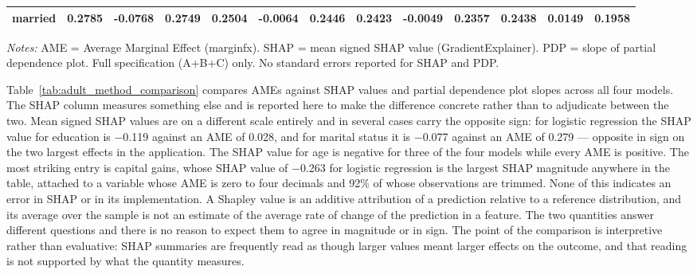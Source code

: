 \documentclass[12pt,a4paper]{article}
\numberwithin{equation}{section}
\theoremstyle{plain}
\theoremstyle{definition}
\begin{document}
\begin{table}
\begin{threeparttable}
\begin{tabular}{lrrrrrrrrrrrr}
				married & 0.2785 & -0.0768 & 0.2749 & 0.2504 & -0.0064 & 0.2446 & 0.2423 & -0.0049 & 0.2357 & 0.2438 & 0.0149 & 0.1958 \\
				\bottomrule
				\end{tabular}
				\begin{tablenotes}
				\footnotesize
				\item \textit{Notes:} AME = Average Marginal Effect (marginfx). SHAP = mean signed SHAP value (GradientExplainer). PDP = slope of partial dependence plot. Full specification (A+B+C) only. No standard errors reported for SHAP and PDP.
				\end{tablenotes}
		\end{threeparttable}
	\end{table}
	
	Table~\ref{tab:adult_method_comparison} compares AMEs against SHAP values and partial dependence plot slopes across all four models. The SHAP column measures something else and is reported here to make the difference concrete rather than to adjudicate between the two. Mean signed SHAP values are on a different scale entirely and in several cases carry the opposite sign: for logistic regression the SHAP value for education is $-$0.119 against an AME of 0.028, and for marital status it is $-$0.077 against an AME of 0.279 --- opposite in sign on the two largest effects in the application. The SHAP value for age is negative for three of the four models while every AME is positive. The most striking entry is capital gains, whose SHAP value of $-$0.263 for logistic regression is the largest SHAP magnitude anywhere in the table, attached to a variable whose AME is zero to four decimals and 92\% of whose observations are trimmed. None of this indicates an error in SHAP or in its implementation. A Shapley value is an additive attribution of a prediction relative to a reference distribution, and its average over the sample is not an estimate of the average rate of change of the prediction in a feature. The two quantities answer different questions and there is no reason to expect them to agree in magnitude or in sign. The point of the comparison is interpretive rather than evaluative: SHAP summaries are frequently read as though larger values meant larger effects on the outcome, and that reading is not supported by what the quantity measures.
\end{document}
